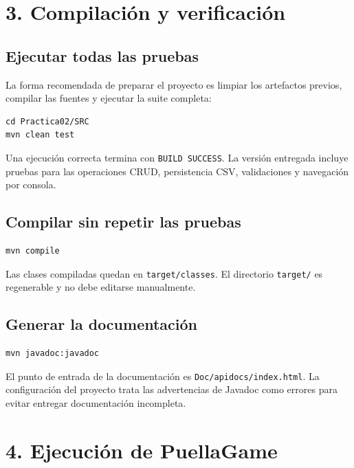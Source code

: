 \documentclass[11pt,letterpaper]{article}
\begin{document}
\section{3. Compilación y verificación}

\subsection{Ejecutar todas las pruebas}

La forma recomendada de preparar el proyecto es limpiar los artefactos previos,
compilar las fuentes y ejecutar la suite completa:

\begin{lstlisting}[style=terminal]
cd Practica02/SRC
mvn clean test
\end{lstlisting}

Una ejecución correcta termina con \texttt{BUILD SUCCESS}. La versión entregada
incluye pruebas para las operaciones CRUD, persistencia CSV, validaciones y
navegación por consola.

\subsection{Compilar sin repetir las pruebas}

\begin{lstlisting}[style=terminal]
mvn compile
\end{lstlisting}

Las clases compiladas quedan en \texttt{target/classes}. El directorio
\texttt{target/} es regenerable y no debe editarse manualmente.

\subsection{Generar la documentación}

\begin{lstlisting}[style=terminal]
mvn javadoc:javadoc
\end{lstlisting}

El punto de entrada de la documentación es
\texttt{Doc/apidocs/index.html}. La configuración del proyecto trata las
advertencias de Javadoc como errores para evitar entregar documentación incompleta.

\section{4. Ejecución de PuellaGame}
\end{document}
